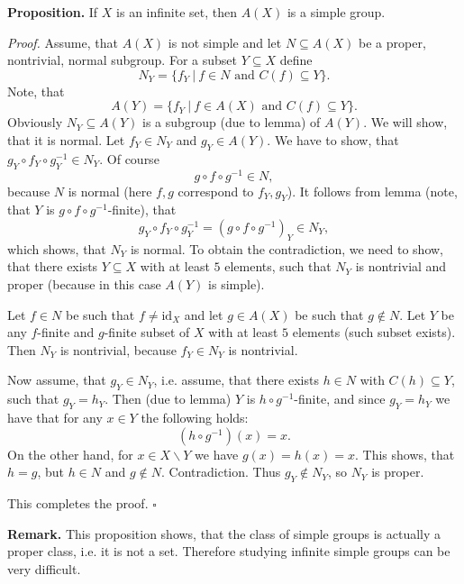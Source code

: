 \documentclass[12pt]{article}
\begin{document}
\textbf{Proposition.} If $X$ is an infinite set, then $A(X)$ is a simple group.

\textit{Proof.} Assume, that $A(X)$ is not simple and let $N\subseteq A(X)$ be a proper, nontrivial, normal subgroup. For a subset $Y\subseteq X$ define
$$N_{Y}=\{f_{Y}\ |\ f\in N\mbox{ and }C(f)\subseteq Y\}.$$
Note, that
$$A(Y)=\{f_Y\ |\ f\in A(X)\mbox{ and } C(f)\subseteq Y\}.$$
Obviously $N_Y\subseteq A(Y)$ is a subgroup (due to lemma) of $A(Y)$. We will show, that it is normal. Let $f_Y\in N_Y$ and $g_Y\in A(Y)$. We have to show, that $g_Y\circ f_Y\circ g_{Y}^{-1}\in N_Y$. Of course 
$$g\circ f\circ g^{-1}\in N,$$
because $N$ is normal (here $f,g$ correspond to $f_Y,g_Y$). It follows from lemma (note, that $Y$ is $g\circ f\circ g^{-1}$-finite), that
$$g_Y\circ f_Y \circ g^{-1}_Y=(g\circ f\circ g^{-1})_Y\in N_Y,$$
which shows, that $N_Y$ is normal. To obtain the contradiction, we need to show, that there exists $Y\subseteq X$ with at least $5$ elements, such that $N_Y$ is nontrivial and proper (because in this case $A(Y)$ is simple).

Let $f\in N$ be such that $f\neq\mathrm{id}_X$ and let $g\in A(X)$ be such that $g\not\in N$. Let $Y$ be any $f$-finite and $g$-finite subset of $X$ with at least $5$ elements (such subset exists). Then $N_Y$ is nontrivial, because $f_Y\in N_Y$ is nontrivial.

Now assume, that $g_Y\in N_Y$, i.e. assume, that there exists $h\in N$ with $C(h)\subseteq Y$, such that $g_Y=h_Y$. Then (due to lemma) $Y$ is $h\circ g^{-1}$-finite, and since $g_Y=h_Y$ we have that for any $x\in Y$ the following holds: $$(h\circ g^{-1})(x)=x.$$ On the other hand, for $x\in X\backslash Y$ we have $g(x)=h(x)=x$. This shows, that $h=g$, but $h\in N$ and $g\not\in N$. Contradiction. Thus $g_Y\not\in N_Y$, so $N_Y$ is proper.

This completes the proof. $\square$

\textbf{Remark.} This proposition shows, that the class of simple groups is actually a proper class, i.e. it is not a set. Therefore studying infinite simple groups can be very difficult.
\end{document}
